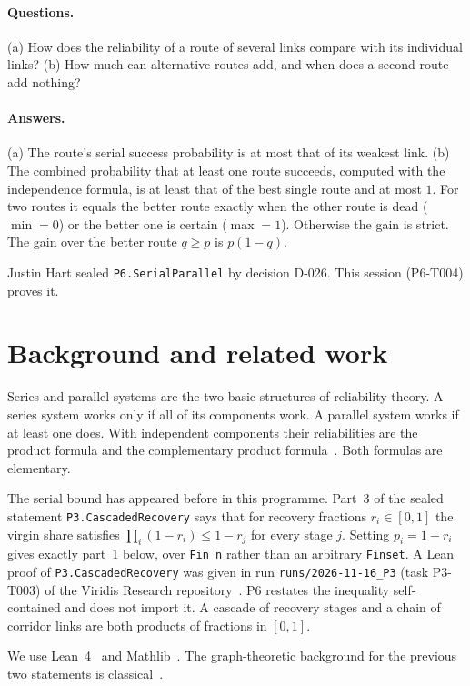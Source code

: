 \documentclass[11pt]{article}
\begin{document}
\paragraph{Questions.} (a) How does the reliability of a route of several links compare with its
individual links? (b) How much can alternative routes add, and when does a second route add nothing?

\paragraph{Answers.} (a) The route's serial success probability is at most that of its weakest link.
(b) The combined probability that at least one route succeeds, computed with the independence formula,
is at least that of the best single route and at most $1$. For two routes it equals the better route
exactly when the other route is dead ($\min=0$) or the better one is certain ($\max=1$). Otherwise the
gain is strict. The gain over the better route $q\ge p$ is $p(1-q)$.

Justin Hart sealed \texttt{P6.SerialParallel} by decision D-026. This session (P6-T004) proves it.

\section{Background and related work}
Series and parallel systems are the two basic structures of reliability theory. A series system works
only if all of its components work. A parallel system works if at least one does. With independent
components their reliabilities are the product formula and the complementary product
formula~\citep{barlowproschan1975}. Both formulas are elementary.

The serial bound has appeared before in this programme. Part~3 of the sealed statement
\texttt{P3.CascadedRecovery} says that for recovery fractions $r_i\in[0,1]$ the virgin share satisfies
$\prod_i(1-r_i)\le 1-r_j$ for every stage $j$. Setting $p_i=1-r_i$ gives exactly part~1 below, over
\texttt{Fin n} rather than an arbitrary \texttt{Finset}. A Lean proof of \texttt{P3.CascadedRecovery}
was given in run \texttt{runs/2026-11-16\_P3} (task P3-T003) of the Viridis Research
repository~\citep{viridisP3T003}. P6 restates the inequality self-contained and does not import it. A
cascade of recovery stages and a chain of corridor links are both products of fractions in $[0,1]$.

We use Lean~4~\citep{lean4} and Mathlib~\citep{mathlib2020}. The graph-theoretic background for the
previous two statements is classical~\citep{diestel2017}.
\end{document}
